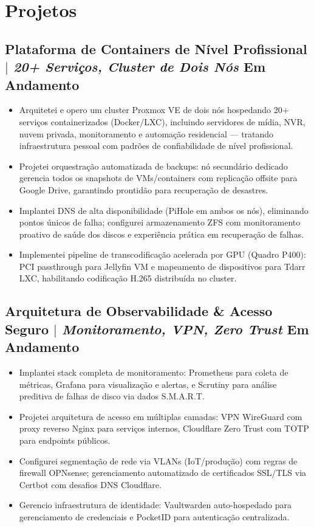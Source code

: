 \documentclass[10pt]{article}
\begin{document}
\section{Projetos}
\subsection{Plataforma de Containers de N\'{i}vel Profissional $|$ \normalfont\textit{20+ Servi\c{c}os, Cluster de Dois N\'{o}s} \hfill Em Andamento}
\begin{itemize}
	\item Arquitetei e opero um cluster Proxmox VE de dois n\'{o}s hospedando 20+ servi\c{c}os containerizados (Docker/LXC), incluindo servidores de m\'{i}dia, NVR, nuvem privada, monitoramento e automa\c{c}\~{a}o residencial --- tratando infraestrutura pessoal com padr\~{o}es de confiabilidade de n\'{i}vel profissional.
	\item Projetei orquestra\c{c}\~{a}o automatizada de backups: n\'{o} secund\'{a}rio dedicado gerencia todos os snapshots de VMs/containers com replica\c{c}\~{a}o offsite para Google Drive, garantindo prontid\~{a}o para recupera\c{c}\~{a}o de desastres.
	\item Implantei DNS de alta disponibilidade (PiHole em ambos os n\'{o}s), eliminando pontos \'{u}nicos de falha; configurei armazenamento ZFS com monitoramento proativo de sa\'{u}de dos discos e experi\^{e}ncia pr\'{a}tica em recupera\c{c}\~{a}o de falhas.
	\item Implementei pipeline de transcodifica\c{c}\~{a}o acelerada por GPU (Quadro P400): PCI passthrough para Jellyfin VM e mapeamento de dispositivos para Tdarr LXC, habilitando codifica\c{c}\~{a}o H.265 distribu\'{i}da no cluster.
\end{itemize}

\subsection{Arquitetura de Observabilidade \& Acesso Seguro $|$ \normalfont\textit{Monitoramento, VPN, Zero Trust} \hfill Em Andamento}
\begin{itemize}
	\item Implantei stack completa de monitoramento: Prometheus para coleta de m\'{e}tricas, Grafana para visualiza\c{c}\~{a}o e alertas, e Scrutiny para an\'{a}lise preditiva de falhas de disco via dados S.M.A.R.T.
	\item Projetei arquitetura de acesso em m\'{u}ltiplas camadas: VPN WireGuard com proxy reverso Nginx para servi\c{c}os internos, Cloudflare Zero Trust com TOTP para endpoints p\'{u}blicos.
	\item Configurei segmenta\c{c}\~{a}o de rede via VLANs (IoT/produ\c{c}\~{a}o) com regras de firewall OPNsense; gerenciamento automatizado de certificados SSL/TLS via Certbot com desafios DNS Cloudflare.
	\item Gerencio infraestrutura de identidade: Vaultwarden auto-hospedado para gerenciamento de credenciais e PocketID para autentica\c{c}\~{a}o centralizada.
\end{itemize}
\end{document}
